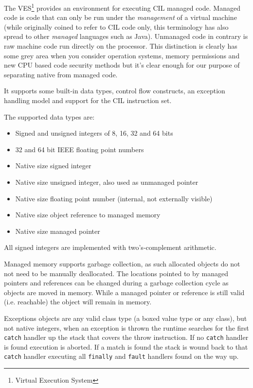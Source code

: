 \documentclass[english]{report}
\begin{document}
The VES\footnote{Virtual Execution System} provides an environment for
executing CIL managed code. Managed code is code that can only be run under the
\emph{management} of a virtual machine (while originally coined to refer to CIL
code only, this terminology has also spread to other \emph{managed} languages
such as Java). Unmanaged code in contrary is raw machine code run directly on the
processor. This distinction is clearly has some grey area when you consider
operation systems, memory permissions and new CPU based code security methods
but it's clear enough for our purpose of separating native from managed code. 

It supports some built-in data types, control flow constructs,
an exception handling model and support for the CIL instruction set.

The supported data types are:
\begin{itemize}
\item Signed and unsigned integers of 8, 16, 32 and 64 bits
\item 32 and 64 bit IEEE floating point numbers
\item Native size signed integer
\item Native size unsigned integer, also used as unmanaged pointer
\item Native size floating point number (internal, not externally visible)
\item Native size object reference to managed memory
\item Native size managed pointer
\end{itemize}

All signed integers are implemented with two's-complement arithmetic.

Managed memory supports garbage collection, as such allocated objects do not
not need to be manually deallocated. The locations pointed to by managed
pointers and references can be changed during a garbage collection cycle as
objects are moved in memory. While a managed pointer or reference is still
valid (i.e. reachable) the object will remain in memory.

Exceptions objects are any valid class type (a boxed value type or any class),
but not native integers, when an exception is thrown the runtime searches for the
first \texttt{catch} handler up the stack that covers the throw instruction. If
no \texttt{catch} handler is found execution is aborted. If a match is found
the stack is wound back to that \texttt{catch} handler executing all
\texttt{finally} and \texttt{fault} handlers found on the way up.
\end{document}
